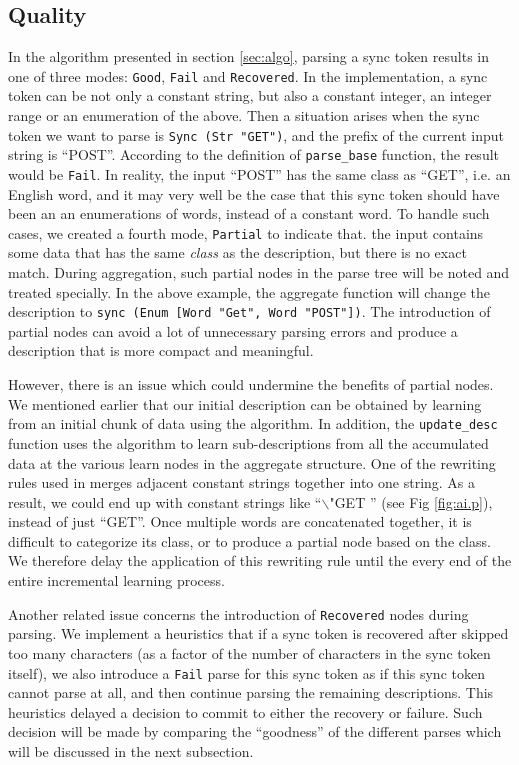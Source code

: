 \subsection{Quality}
In the algorithm presented in section \ref{sec:algo}, parsing a sync token results
in one of three modes: {\tt Good}, {\tt Fail} and {\tt Recovered}. 
In the implementation, a sync token can be not only a constant string, but also
a constant integer, an integer range or an enumeration of the above.
Then a situation arises when the sync token we want to parse is {\tt Sync (Str "GET")},
and the prefix of the current input string is ``POST''. According to the
definition of {\tt parse\_base} function, the result would be {\tt Fail}.
In reality, the input ``POST'' has the same class as ``GET'', i.e. an English word,
and it may very well be the case that this sync token should have been 
an an enumerations of words, instead of a constant word.
To handle such cases, we created a fourth mode, {\tt Partial} to indicate that. 
the input contains some data that has the same {\em class} as the description,
but there is no exact match. During aggregation, such partial nodes in the parse
tree will be noted and treated specially. In the above example, the aggregate 
function will change the description to {\tt sync (Enum [Word "Get", Word "POST"])}.
The introduction of partial nodes can avoid a lot of unnecessary parsing errors
and produce a description that is more compact and meaningful. 

However, there is an issue which could undermine the benefits of partial nodes.
We mentioned earlier that our initial description can be obtained by learning
from an initial chunk of data using the \learnpads{} algorithm. In addition,
the {\tt update\_desc} function uses the \learnpads{} algorithm to learn 
sub-descriptions from all the accumulated data at the various learn nodes 
in the aggregate structure. One of the rewriting rules used in \learnpads{}
merges adjacent constant strings together into one string. As a result, we
could end up with constant strings like ``$\backslash$"GET '' 
(see Fig \ref{fig:ai.p}), instead of just ``GET''. Once multiple words are
concatenated together, it is difficult to categorize its class, or to
produce a partial node based on the class. We therefore delay the application of
this rewriting rule until the every end of the entire incremental learning process.

Another related issue concerns the introduction of {\tt Recovered} nodes 
during parsing. We implement a heuristics that if a sync token is recovered
after skipped too many characters (as a factor of the number of characters in
the sync token itself), we also introduce a {\tt Fail} parse for this sync
token as if this sync token cannot parse at all, and then continue parsing the 
remaining descriptions. This heuristics delayed a decision to commit to
either the recovery or failure. Such decision will be made by comparing the 
``goodness'' of the different parses which will be discussed in the next
subsection.
 
